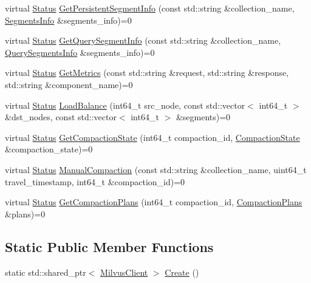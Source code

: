 \begin{DoxyCompactItemize}
\item 
virtual \hyperlink{classmilvus_1_1_status}{Status} \hyperlink{classmilvus_1_1_milvus_client_a383e2ef16d4add6af450170775869604}{Get\+Persistent\+Segment\+Info} (const std\+::string \&collection\+\_\+name, \hyperlink{namespacemilvus_ac4d75d0f392eb243587a67248164636b}{Segments\+Info} \&segments\+\_\+info)=0
\item 
virtual \hyperlink{classmilvus_1_1_status}{Status} \hyperlink{classmilvus_1_1_milvus_client_a7a5a78cb57e5d80adea1f1b0bffe5ba0}{Get\+Query\+Segment\+Info} (const std\+::string \&collection\+\_\+name, \hyperlink{namespacemilvus_a12c0975ef69afebb6673596a78f0c1c6}{Query\+Segments\+Info} \&segments\+\_\+info)=0
\item 
virtual \hyperlink{classmilvus_1_1_status}{Status} \hyperlink{classmilvus_1_1_milvus_client_a438488cdb507bc9715a79fec644c7065}{Get\+Metrics} (const std\+::string \&request, std\+::string \&response, std\+::string \&component\+\_\+name)=0
\item 
virtual \hyperlink{classmilvus_1_1_status}{Status} \hyperlink{classmilvus_1_1_milvus_client_a2f56b370148934a1efd1f3ba48ec1b09}{Load\+Balance} (int64\+\_\+t src\+\_\+node, const std\+::vector$<$ int64\+\_\+t $>$ \&dst\+\_\+nodes, const std\+::vector$<$ int64\+\_\+t $>$ \&segments)=0
\item 
virtual \hyperlink{classmilvus_1_1_status}{Status} \hyperlink{classmilvus_1_1_milvus_client_a8041cd363470774d2cdb3c295307e1d9}{Get\+Compaction\+State} (int64\+\_\+t compaction\+\_\+id, \hyperlink{classmilvus_1_1_compaction_state}{Compaction\+State} \&compaction\+\_\+state)=0
\item 
virtual \hyperlink{classmilvus_1_1_status}{Status} \hyperlink{classmilvus_1_1_milvus_client_aded6fdc88693663dd6f501d6191658d3}{Manual\+Compaction} (const std\+::string \&collection\+\_\+name, uint64\+\_\+t travel\+\_\+timestamp, int64\+\_\+t \&compaction\+\_\+id)=0
\item 
virtual \hyperlink{classmilvus_1_1_status}{Status} \hyperlink{classmilvus_1_1_milvus_client_a39d54736f4b08bba8d6b055277aa71ea}{Get\+Compaction\+Plans} (int64\+\_\+t compaction\+\_\+id, \hyperlink{namespacemilvus_ae8e1cc7774a3ff7a1c5d564c1937bec8}{Compaction\+Plans} \&plans)=0
\end{DoxyCompactItemize}
\subsection*{Static Public Member Functions}
\begin{DoxyCompactItemize}
\item 
static std\+::shared\+\_\+ptr$<$ \hyperlink{classmilvus_1_1_milvus_client}{Milvus\+Client} $>$ \hyperlink{classmilvus_1_1_milvus_client_a2fadefe95c16f9a5ea11bc899fc878bd}{Create} ()
\end{DoxyCompactItemize}


